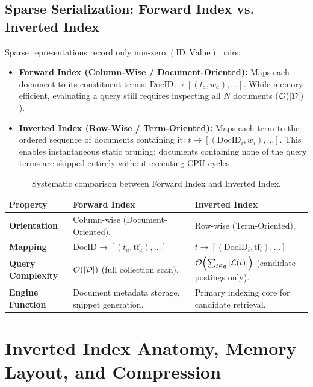 \subsection{Sparse Serialization: Forward Index vs. Inverted Index}
Sparse representations record only non-zero $(\text{ID}, \text{Value})$ pairs:
\begin{itemize}
    \item \textbf{Forward Index (Column-Wise / Document-Oriented):} Maps each document to its constituent terms: $\text{DocID} \to [(t_a, w_a), \dots]$. While memory-efficient, evaluating a query still requires inspecting all $N$ documents ($\mathcal{O}\!\left(|\mathcal{D}|\right)$).
    \item \textbf{Inverted Index (Row-Wise / Term-Oriented):} Maps each term to the ordered sequence of documents containing it: $t \to [(\text{DocID}_i, w_i), \dots]$. This enables instantaneous static pruning: documents containing none of the query terms are skipped entirely without executing CPU cycles.
\end{itemize}

\begin{table}[H]
\centering
\small
\begin{tabularx}{\linewidth}{l >{\raggedright\arraybackslash}X >{\raggedright\arraybackslash}X}
\toprule
\textbf{Property} & \textbf{Forward Index} & \textbf{Inverted Index} \\
\midrule
\textbf{Orientation} & Column-wise (Document-Oriented). & Row-wise (Term-Oriented). \\
\addlinespace
\textbf{Mapping} & $\text{DocID} \to [(t_a, \text{tf}_a), \dots]$ & $t \to [(\text{DocID}_i, \text{tf}_i), \dots]$ \\
\addlinespace
\textbf{Query Complexity} & $\mathcal{O}\!\left(|\mathcal{D}|\right)$ (full collection scan). & $\mathcal{O}\!\left(\sum_{t \in q} |\mathcal{L}(t)|\right)$ (candidate postings only). \\
\addlinespace
\textbf{Engine Function} & Document metadata storage, snippet generation. & Primary indexing core for candidate retrieval. \\
\bottomrule
\end{tabularx}
\caption{Systematic comparison between Forward Index and Inverted Index.}
\label{tab:fwd-vs-inv-en}
\end{table}

\FloatBarrier
\section{Inverted Index Anatomy, Memory Layout, and Compression}
\label{sec:inverted-index-anatomy-en}

